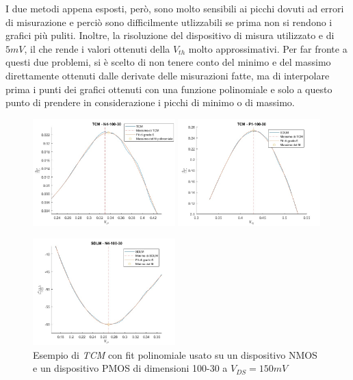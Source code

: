 \documentclass[12pt, letterpaper]{book}
\begin{document}
I due metodi appena esposti, però, sono molto sensibili ai picchi dovuti ad errori di misurazione e perciò sono difficilmente utlizzabili se prima non si rendono i grafici più puliti. Inoltre, la risoluzione del dispositivo di misura utilizzato e di $5 mV$, il che rende i valori ottenuti della $V_{th}$ molto approssimativi.
Per far fronte a questi due problemi, si è scelto di non tenere conto del minimo e del massimo direttamente ottenuti dalle derivate delle misurazioni fatte, ma di interpolare prima i punti dei grafici ottenuti con una funzione polinomiale e solo a questo punto di prendere in considerazione i picchi di minimo o di massimo. \\

\begin{figure}[h!]
\centering
 \includegraphics[width=0.49\textwidth]{TCM-N4-100-30}
 \includegraphics[width=0.49\textwidth]{TCM-P1-100-30}
 \caption{Esempio di \emph{TCM} con fit polinomiale usato su un dispositivo NMOS e un dispositivo PMOS di dimensioni 100-30 a $V_{DS} = 150 mV$}
 \includegraphics[width=0.49\textwidth]{SDLM-N4-100-30}

\end{figure}
\end{document}
